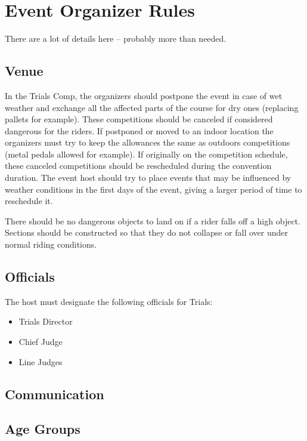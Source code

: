 \chapter{Event Organizer Rules}

\begin{comment2016}
There are a lot of details here -- probably more than needed.
\end{comment2016}

\section{Venue}

In the Trials Comp, the organizers should postpone the event in case of wet weather and exchange all the affected parts of the course for dry ones (replacing pallets for example).
These competitions should be canceled if considered dangerous for the riders.
If postponed or moved to an indoor location the organizers must try to keep the allowances the same as outdoors competitions (metal pedals allowed for example).
If originally on the competition schedule, these canceled competitions should be rescheduled during the convention duration.
The event host should try to place events that may be influenced by weather conditions in the first days of the event, giving a larger period of time to reschedule it.

There should be no dangerous objects to land on if a rider falls off a high object.
Sections should be constructed so that they do not collapse or fall over under normal riding conditions.

\section{Officials}

The host must designate the following officials for Trials:
\begin{itemize}
\item Trials Director
\item Chief Judge
\item Line Judges
\end{itemize}

\section{Communication}

\section{Age Groups}

